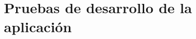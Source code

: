 \section{Pruebas de desarrollo de la aplicación}

  \begin{enumerate}
    
    
    
  \end{enumerate}
